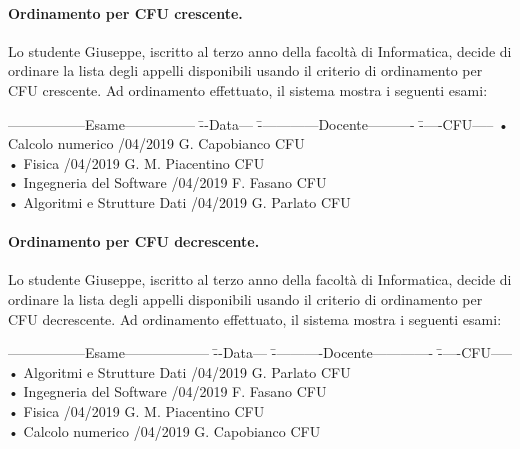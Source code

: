 \paragraph{Ordinamento per CFU crescente.}
Lo studente Giuseppe, iscritto al terzo anno della facoltà di Informatica, decide di ordinare la lista degli appelli disponibili usando il criterio di ordinamento per CFU crescente. Ad ordinamento effettuato, il sistema mostra i seguenti esami:
\begin{tabbing}
	\hspace{1cm}-----------------Esame--------------- \= --Data--- \= -------------Docente---------- \= -----CFU-----\kill
	\hspace{1cm} • Calcolo numerico /04/2019  \> \hspace{1cm} G. Capobianco  CFU\\
	\hspace{1cm} • Fisica /04/2019 \> \hspace{1cm} G. M. Piacentino   CFU\\
	\hspace{1cm} • Ingegneria del Software /04/2019   \> \hspace{1cm} F. Fasano  CFU\\
	\hspace{1cm} • Algoritmi e Strutture Dati /04/2019 \> \hspace{1cm} G. Parlato  CFU\\	
\end{tabbing}

\paragraph{Ordinamento per CFU decrescente.}
Lo studente Giuseppe, iscritto al terzo anno della facoltà di Informatica, decide di ordinare la lista degli appelli disponibili usando il criterio di ordinamento per CFU decrescente. Ad ordinamento effettuato, il sistema mostra i seguenti esami:
\begin{tabbing}
	\hspace{1cm}-----------------Esame------------------ \= --Data--- \= -----------Docente------------- \= -----CFU----- \kill
	\hspace{1cm} • Algoritmi e Strutture Dati /04/2019 \> \hspace{1cm} G. Parlato  CFU\\
	\hspace{1cm} • Ingegneria del Software /04/2019   \> \hspace{1cm} F. Fasano  CFU\\
	\hspace{1cm} • Fisica /04/2019 \> \hspace{1cm} G. M. Piacentino   CFU\\
	\hspace{1cm} • Calcolo numerico /04/2019  \> \hspace{1cm} G. Capobianco  CFU\\	
\end{tabbing} 


